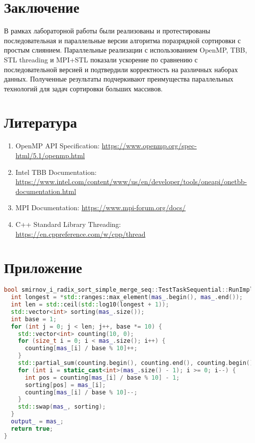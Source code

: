 \documentclass[a4paper,12pt]{article}
\begin{document}
\section{Заключение}
В рамках лабораторной работы были реализованы и протестированы последовательная и параллельные версии алгоритма поразрядной сортировки с простым слиянием. Параллельные реализации с использованием OpenMP, TBB, STL threading и MPI+STL показали ускорение по сравнению с последовательной версией и подтвердили корректность на различных наборах данных. Полученные результаты подчеркивают преимущества параллельных технологий для задач сортировки больших массивов.

\section{Литература}
\begin{enumerate}
    \item OpenMP API Specification: \url{https://www.openmp.org/spec-html/5.1/openmp.html}
    \item Intel TBB Documentation: \url{https://www.intel.com/content/www/us/en/developer/tools/oneapi/onetbb-documentation.html}
    \item MPI Documentation: \url{https://www.mpi-forum.org/docs/}
    \item C++ Standard Library Threading: \url{https://en.cppreference.com/w/cpp/thread}
\end{enumerate}

\newpage
\section{Приложение}
\begin{lstlisting}[language=C++,caption={Фрагмент последовательной версии}]
bool smirnov_i_radix_sort_simple_merge_seq::TestTaskSequential::RunImpl() {
  int longest = *std::ranges::max_element(mas_.begin(), mas_.end());
  int len = std::ceil(std::log10(longest + 1));
  std::vector<int> sorting(mas_.size());
  int base = 1;
  for (int j = 0; j < len; j++, base *= 10) {
    std::vector<int> counting(10, 0);
    for (size_t i = 0; i < mas_.size(); i++) {
      counting[mas_[i] / base % 10]++;
    }
    std::partial_sum(counting.begin(), counting.end(), counting.begin());
    for (int i = static_cast<int>(mas_.size() - 1); i >= 0; i--) {
      int pos = counting[mas_[i] / base % 10] - 1;
      sorting[pos] = mas_[i];
      counting[mas_[i] / base % 10]--;
    }
    std::swap(mas_, sorting);
  }
  output_ = mas_;
  return true;
}
\end{lstlisting}
\end{document}
